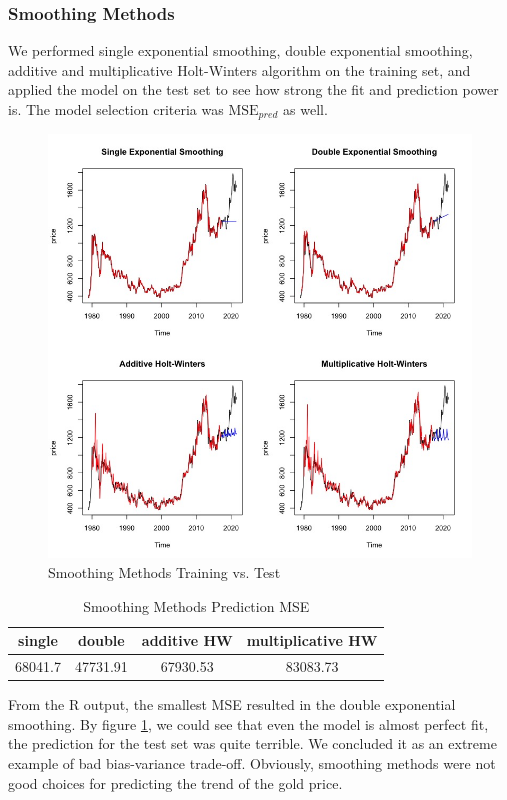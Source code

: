 \documentclass[paper=letter, fontsize=11pt]{scrartcl}
\begin{document}
\subsubsection{Smoothing Methods}
\label{sec:smooth}

We performed single exponential smoothing, double exponential smoothing, additive and multiplicative Holt-Winters algorithm on the training set, and applied the model on the test set to see how strong the fit and prediction power is. 
The model selection criteria was $\mathrm{MSE}_{pred}$ as well.

\begin{figure}[ht]
    \centering
    \includegraphics[width=0.75\linewidth]{Image/smoothing-summary.jpeg}
    \caption{Smoothing Methods Training vs. Test}
    \label{fig:smoothing-comp}
\end{figure}
\begin{table}[H]
    \centering
    \begin{tabular}{|c|c|c|c|}
    \hline
    single & double & additive HW & multiplicative HW \\
    \hline\hline
    68041.7 & 47731.91 &  67930.53  &  83083.73 \\
    \hline
    \end{tabular}
    \caption{Smoothing Methods Prediction MSE}
\end{table}

From the R output, the smallest MSE resulted in the double exponential smoothing. By figure \ref{fig:smoothing-comp}, we could see that even the model is almost perfect fit, the prediction for the test set was quite terrible. 
We concluded it as an extreme example of bad bias-variance trade-off. Obviously, smoothing methods were not good choices for predicting the trend of the gold price.
\end{document}
